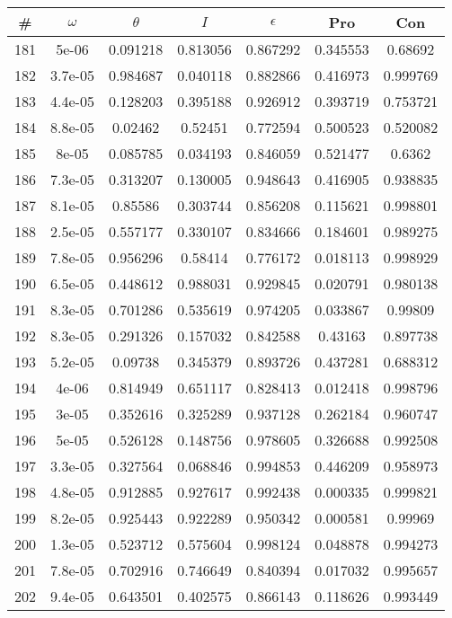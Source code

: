 \newpage
\begin{table}
\begin{tabular}{c|c|c|c|c|c|c}
\# & $\omega$ & $\theta$ & $I$ & $\epsilon$ & Pro & Con\\
\hline
181 & 5e-06 & 0.091218 & 0.813056 & 0.867292 & 0.345553 & 0.68692\\
182 & 3.7e-05 & 0.984687 & 0.040118 & 0.882866 & 0.416973 & 0.999769\\
183 & 4.4e-05 & 0.128203 & 0.395188 & 0.926912 & 0.393719 & 0.753721\\
184 & 8.8e-05 & 0.02462 & 0.52451 & 0.772594 & 0.500523 & 0.520082\\
185 & 8e-05 & 0.085785 & 0.034193 & 0.846059 & 0.521477 & 0.6362\\
186 & 7.3e-05 & 0.313207 & 0.130005 & 0.948643 & 0.416905 & 0.938835\\
187 & 8.1e-05 & 0.85586 & 0.303744 & 0.856208 & 0.115621 & 0.998801\\
188 & 2.5e-05 & 0.557177 & 0.330107 & 0.834666 & 0.184601 & 0.989275\\
189 & 7.8e-05 & 0.956296 & 0.58414 & 0.776172 & 0.018113 & 0.998929\\
190 & 6.5e-05 & 0.448612 & 0.988031 & 0.929845 & 0.020791 & 0.980138\\
191 & 8.3e-05 & 0.701286 & 0.535619 & 0.974205 & 0.033867 & 0.99809\\
192 & 8.3e-05 & 0.291326 & 0.157032 & 0.842588 & 0.43163 & 0.897738\\
193 & 5.2e-05 & 0.09738 & 0.345379 & 0.893726 & 0.437281 & 0.688312\\
194 & 4e-06 & 0.814949 & 0.651117 & 0.828413 & 0.012418 & 0.998796\\
195 & 3e-05 & 0.352616 & 0.325289 & 0.937128 & 0.262184 & 0.960747\\
196 & 5e-05 & 0.526128 & 0.148756 & 0.978605 & 0.326688 & 0.992508\\
197 & 3.3e-05 & 0.327564 & 0.068846 & 0.994853 & 0.446209 & 0.958973\\
198 & 4.8e-05 & 0.912885 & 0.927617 & 0.992438 & 0.000335 & 0.999821\\
199 & 8.2e-05 & 0.925443 & 0.922289 & 0.950342 & 0.000581 & 0.99969\\
200 & 1.3e-05 & 0.523712 & 0.575604 & 0.998124 & 0.048878 & 0.994273\\
201 & 7.8e-05 & 0.702916 & 0.746649 & 0.840394 & 0.017032 & 0.995657\\
202 & 9.4e-05 & 0.643501 & 0.402575 & 0.866143 & 0.118626 & 0.993449\\

\end{tabular}
\end{table}
